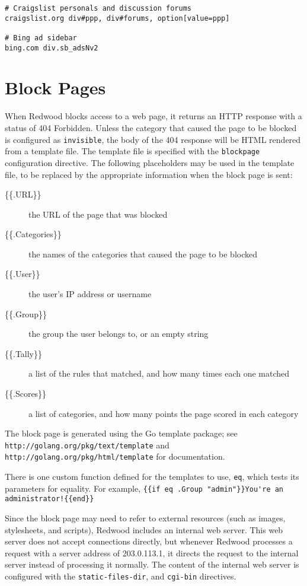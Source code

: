 \documentclass{article}
\begin{document}
\begin{verbatim}
# Craigslist personals and discussion forums
craigslist.org div#ppp, div#forums, option[value=ppp]

# Bing ad sidebar
bing.com div.sb_adsNv2
\end{verbatim}

\section{Block Pages}

When Redwood blocks access to a web page, 
it returns an HTTP response with a status of 404 Forbidden.
Unless the category that caused the page to be blocked is configured as \verb"invisible",
the body of the 404 response will be HTML rendered from a template file.
The template file is specified with the \verb"blockpage" configuration directive.
The following placeholders may be used in the template file, 
to be replaced by the appropriate information when the block page is sent:

\begin{description}

\item[\{\{.URL\}\}] the URL of the page that was blocked
\item[\{\{.Categories\}\}] the names of the categories that caused the page to be blocked
\item[\{\{.User\}\}] the user's IP address or username
\item[\{\{.Group\}\}] the group the user belongs to, or an empty string
\item[\{\{.Tally\}\}] a list of the rules that matched, and how many times each one matched
\item[\{\{.Scores\}\}] a list of categories, and how many points the page scored in each category

\end{description}

The block page is generated using the Go template package; see
\verb"http://golang.org/pkg/text/template"
and
\verb"http://golang.org/pkg/html/template"
for documentation.

There is one custom function defined for the templates to use, \verb"eq", 
which tests its parameters for equality.
For example, \verb[{{if eq .Group "admin"}}You're an administrator!{{end}}[

Since the block page may need to refer to external resources
(such as images, stylesheets, and scripts),
Redwood includes an internal web server.
This web server does not accept connections directly,
but whenever Redwood processes a request with a server address of 203.0.113.1,
it directs the request to the internal server instead of processing it normally.
The content of the internal web server is configured with the 
\verb"static-files-dir", and \verb"cgi-bin" directives.
\end{document}
